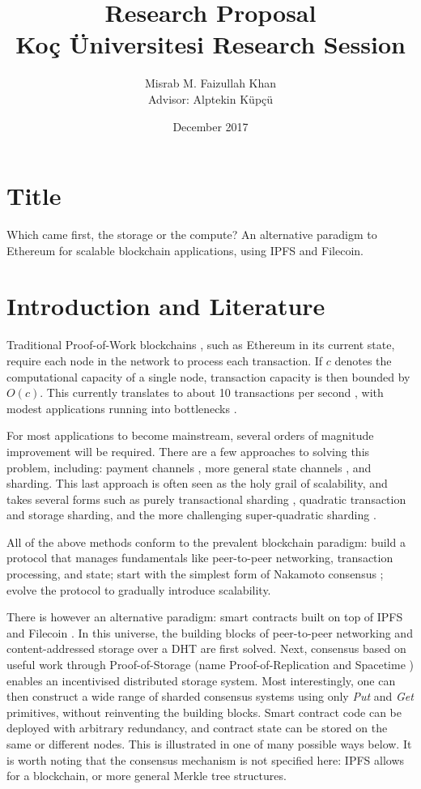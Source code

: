 \documentclass[12pt]{article}
\title{Research Proposal \\ Ko{\c c} {\" U}niversitesi Research Session}
\author{Misrab M. Faizullah Khan \\ Advisor: Alptekin K{\" u}p{\c c}{\" u}}
\affil[]{Ko{\c c} {\" U}niversitesi Computer Engineering Department}
\affil[]{\href{mailto:faizullah.misrab@gmail.com}{faizullah.misrab@gmail.com}, \href{mailto:akupcu@ku.edu.tr}{akupcu@ku.edu.tr}}
\date{December 2017}
\begin{document}
\maketitle


\section*{Title}

Which came first, the storage or the compute? An alternative paradigm to Ethereum for scalable blockchain applications, using IPFS and Filecoin.

\section*{Introduction and Literature}

Traditional Proof-of-Work blockchains \cite{bitcoin}, such as Ethereum \cite{ethereum} in its current state, require each node in the network to process each transaction. If $c$ denotes the computational capacity of a single node, transaction capacity is then bounded by $O(c)$. This currently translates to about 10 transactions per second \cite{ethereum-tps}, with modest applications running into bottlenecks \cite{cryptokitties}.

For most applications to become mainstream, several orders of magnitude improvement will be required. There are a few approaches to solving this problem, including: payment channels \cite{lightning}, more general state channels \cite{plasma}, and sharding. This last approach is often seen as the holy grail of scalability, and takes several forms such as purely transactional sharding \cite{elastico}, quadratic transaction and storage sharding, and the more challenging super-quadratic sharding \cite{sharding}.

All of the above methods conform to the prevalent blockchain paradigm: build a protocol that manages fundamentals like peer-to-peer networking, transaction processing, and state; start with the simplest form of Nakamoto consensus \cite{nakamoto}; evolve the protocol to gradually introduce scalability.

There is however an alternative paradigm: smart contracts built on top of IPFS \cite{ipfs} and Filecoin \cite{filecoin}. In this universe, the building blocks of peer-to-peer networking and content-addressed storage over a DHT \cite{dht} are first solved. Next, consensus based on useful work through Proof-of-Storage (name Proof-of-Replication and Spacetime \cite{porep}) enables an incentivised distributed storage system. Most interestingly, one can then construct a wide range of sharded consensus systems using only \textit{Put} and \textit{Get} primitives, without reinventing the building blocks. Smart contract code can be deployed with arbitrary redundancy, and contract state can be stored on the same or different nodes. This is illustrated in one of many possible ways below. It is worth noting that the consensus mechanism is not specified here: IPFS allows for a blockchain, or more general Merkle \cite{merkle} tree structures.
\end{document}

